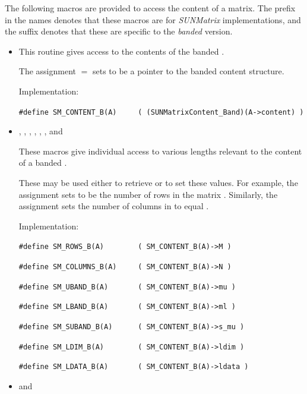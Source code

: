\noindent The following macros are provided to access the
content of a {\sunmatband} matrix. The prefix  in the names
denotes that these macros are for \emph{SUNMatrix} implementations,
and the suffix  denotes that these are specific to
the \emph{banded} version.
\begin{itemize}

\item {}

  This routine gives access to the contents of the
  banded .

  The assignment  $=$  sets
   to be a pointer to the banded  content
  structure.

  Implementation:

  \verb|#define SM_CONTENT_B(A)     ( (SUNMatrixContent_Band)(A->content) )|

\item {}, , , , , , and 

  These macros give individual access to various lengths relevant to the
  content of a banded .

  These may be used either to retrieve or to set these values.  For
  example, the assignment  sets  to be
  the number of rows in the matrix .  Similarly, the
  assignment  sets the number of
  columns in  to equal .

  Implementation:

  \verb|#define SM_ROWS_B(A)        ( SM_CONTENT_B(A)->M )|

  \verb|#define SM_COLUMNS_B(A)     ( SM_CONTENT_B(A)->N )|

  \verb|#define SM_UBAND_B(A)       ( SM_CONTENT_B(A)->mu )|

  \verb|#define SM_LBAND_B(A)       ( SM_CONTENT_B(A)->ml )|

  \verb|#define SM_SUBAND_B(A)      ( SM_CONTENT_B(A)->s_mu )|

  \verb|#define SM_LDIM_B(A)        ( SM_CONTENT_B(A)->ldim )|

  \verb|#define SM_LDATA_B(A)       ( SM_CONTENT_B(A)->ldata )|

\item {} and 


\end{itemize}

